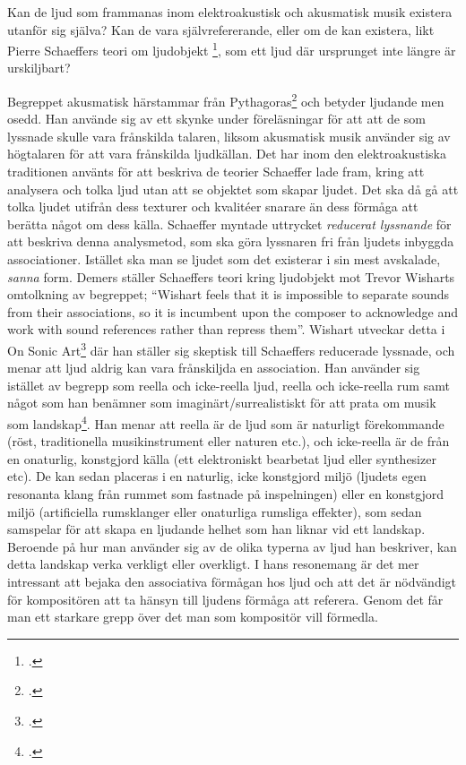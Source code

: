 \documentclass{article}
\begin{document}
Kan de ljud som frammanas inom elektroakustisk och akusmatisk musik existera utanför sig själva? Kan de vara
självrefererande, eller om de kan existera, likt Pierre Schaeffers teori om ljudobjekt
\footcite{PierreSchaeffer}, som ett ljud där ursprunget inte längre är urskiljbart?

Begreppet akusmatisk härstammar från Pythagoras\footcite{oxford} och betyder ljudande men osedd. Han använde
sig av ett skynke under föreläsningar för att att de som lyssnade skulle vara frånskilda talaren, liksom
akusmatisk musik använder sig av högtalaren för att vara frånskilda ljudkällan. Det har inom den
elektroakustiska traditionen använts för att beskriva de teorier Schaeffer lade fram, kring att analysera och
tolka ljud utan att se objektet som skapar ljudet. Det ska då gå att tolka ljudet utifrån dess texturer och
kvalitéer snarare än dess förmåga att berätta något om dess källa. Schaeffer myntade uttrycket \emph{reducerat
lyssnande} för att beskriva denna analysmetod, som ska göra lyssnaren fri från ljudets inbyggda associationer.
Istället ska man se ljudet som det existerar i sin mest avskalade, \emph{sanna} form. Demers ställer
Schaeffers teori kring ljudobjekt mot Trevor Wisharts omtolkning av begreppet; ``Wishart feels that it is
impossible to separate sounds from their associations, so it is incumbent upon the composer to acknowledge and
work with sound references rather than repress them''. Wishart utveckar detta i On Sonic
Art\footcite{TrevorWishart} där han ställer sig skeptisk till Schaeffers reducerade lyssnade, och menar att
ljud aldrig kan vara frånskiljda en association. Han använder sig istället av begrepp som reella och
icke-reella ljud, reella och icke-reella rum samt något som han benämner som imaginärt/surrealistiskt för att
prata om musik som landskap\footcite[144-147]{TrevorWishart}. Han menar att reella är de ljud som är naturligt
förekommande (röst, traditionella musikinstrument eller naturen etc.), och icke-reella är de från en
onaturlig, konstgjord källa (ett elektroniskt bearbetat ljud eller synthesizer etc). De kan sedan placeras i
en naturlig, icke konstgjord miljö (ljudets egen resonanta klang från rummet som fastnade på inspelningen)
eller en konstgjord miljö (artificiella rumsklanger eller onaturliga rumsliga effekter), som sedan samspelar
för att skapa en ljudande helhet som han liknar vid ett landskap. Beroende på hur man använder sig av de olika
typerna av ljud han beskriver, kan detta landskap verka verkligt eller overkligt. I hans resonemang är det mer
intressant att bejaka den associativa förmågan hos ljud och att det är nödvändigt för kompositören att ta
hänsyn till ljudens förmåga att referera. Genom det får man ett starkare grepp över det man som kompositör
vill förmedla.
\end{document}
